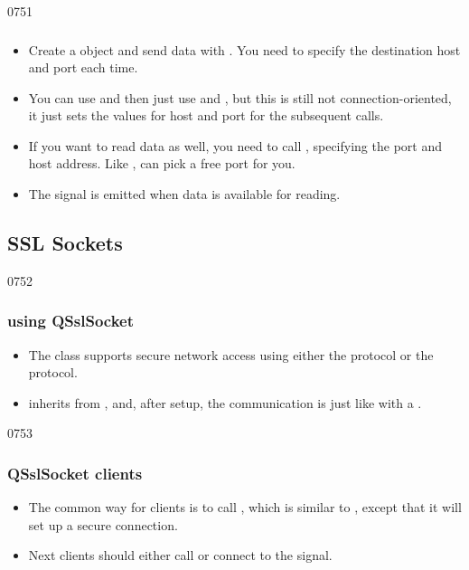 \begin{slide}{0751}
\frametitle{}
  \begin{itemize}
  \item Create a  object and send data with
        . You need to specify the destination host and
        port each time.
  \item You can use  and then just use
         and , but this is still not
        connection-oriented, it just sets the values for host and port
        for the subsequent calls.
  \item If you want to read data as well, you need to call
        , specifying the port and host address. Like
        ,  can pick a
        free port for you.
  \item The signal  is emitted when data is
        available for reading.
  \end{itemize}
\end{slide}

\subsection{SSL Sockets}
\begin{slide}{0752}
\frametitle{ using QSslSocket}
\begin{itemize}
\item The class  supports secure network access using
  either the  protocol  or the  protocol.
\item {} inherits from , and, after setup,
  the communication is just like with a .
\end{itemize}
\end{slide}

\begin{slide}{0753}
\frametitle{QSslSocket clients}
\begin{itemize}
\item The common way for clients is to call
  , which is similar to
  , except that it will set up a secure
  connection. 
\item Next clients should either call  or
  connect to the  signal.
\end{itemize}
\end{slide}

